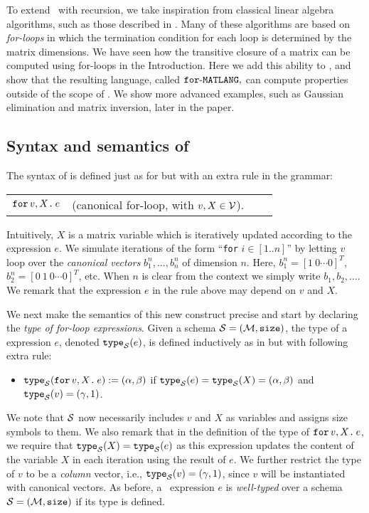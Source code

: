 
To extend \lang\ with recursion, we take inspiration from classical linear algebra algorithms, such as those described in \cite{num}. Many of these algorithms are based on \textit{for-loops} in which the termination condition for each loop is determined by the matrix dimensions. We have seen how the transitive closure of a matrix can be computed using for-loops in the Introduction. Here we add this ability to \lang, and show that the resulting language, called $\texttt{for}\text{-}\texttt{MATLANG},$ can compute properties outside of the scope of \lang. We show more advanced examples, such as Gaussian elimination and matrix inversion, later in the paper. 

\subsection{Syntax and semantics of \langfor}\label{ss:fML} The syntax of \langfor is defined just as for \lang but with an extra rule in the grammar:
\medskip

\begin{tabular}{lcll}
 $\texttt{for}\, v,X \texttt{.}\, e$ & (canonical for-loop, with $v, X \in \mathcal{V}$). 
\end{tabular}

\medskip
\noindent Intuitively, $X$ is a matrix variable which is iteratively updated according to the expression $e$. We simulate iterations of the form ``\texttt{for} $i\in [1..n]$'' by letting $v$ loop over the \textit{canonical vectors} $b_1^n,\ldots,b_n^n$ of dimension $n$. Here,
$b_1^n = [1\ 0 \cdots 0]^T$, $b_2^n = [0\ 1\ 0 \cdots 0]^T$, etc. When $n$ is clear from the context we simply write $b_1,b_2,\ldots$. We remark that the expression $e$ in the rule above may depend on $v$ and $X$. 

We next make the semantics of this new construct precise and start by
declaring the \textit{type of for-loop expressions}.
Given a schema $\mathcal{S}=(\mathcal{M},\texttt{size})$, the type of a \langfor expression $e$, denoted $\texttt{type}_{\mathcal{S}}(e)$, is defined inductively as in \lang but with following extra rule:
\begin{itemize}
\item $\texttt{type}_{\mathcal{S}}(\texttt{for}\, v,X \texttt{.}\, e) := (\alpha,\beta)$ if 
$\texttt{type}_{\mathcal{S}}(e)=\texttt{type}_{\mathcal{S}}(X) =(\alpha,\beta)$ and $\texttt{type}_{\mathcal{S}}(v) = (\gamma,1)$.
\end{itemize}
We note that $\mathcal{S}$ now necessarily includes $v$ and $X$ as variables and assigns size symbols to them.
We also remark that in the definition of the type of $\texttt{for}\, v,X \texttt{.}\, e$, we require that $\texttt{type}_{\mathcal{S}}(X) = \texttt{type}_{\mathcal{S}}(e)$ as this expression updates the content of the variable $X$ in each iteration using the result of $e$. We further restrict the type of 
$v$ to be a \textit{column} vector, i.e., $\texttt{type}_{\mathcal{S}}(v)=(\gamma,1)$, since $v$ will be instantiated with canonical vectors. As before,
a \langfor\ expression $e$ is \textit{well-typed} over a schema $\mathcal{S}=(\mathcal{M},\texttt{size})$ if its type is defined. 

